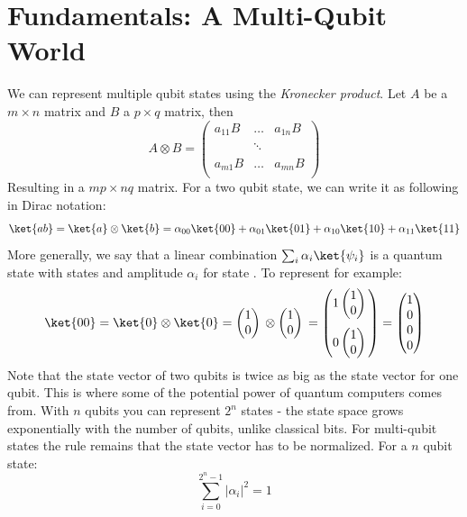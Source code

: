 \documentclass[11pt, notitlepage]{report}
\newcommand{\qstatezero}{
  \begin{pmatrix}1 \\ 0\end{pmatrix}
}
\begin{document}
\newpage

\chapter{Fundamentals: A Multi-Qubit World}
We can represent multiple qubit states using the \emph{Kronecker product}. Let $A$ be a $m \times n$ matrix and $B$ a $p \times q$ matrix, then
\[
A \otimes B =
  \begin{pmatrix}
  a_{11}B & \dots & a_{1n}B \\
  \phantom{a_{11}B} & \ddots & \phantom{a_{1n}B} \\
  a_{m1}B & \dots & a_{mn}B \\
  \end{pmatrix}
\]
Resulting in a $mp \times nq$ matrix. For a two qubit state, we can write it as following in Dirac notation:
\[
  \ket{ab} = \ket{a} \otimes \ket{b} = \alpha_{00}\ket{00} + \alpha_{01}\ket{01} + \alpha_{10}\ket{10} + \alpha_{11}\ket{11}
\]
More generally, we say that a linear combination $\sum_{i} \alpha_i\ket{\psi_i}$ is a quantum state with states  and amplitude $\alpha_i$ for state . To represent  for example:
\[
  \ket{00} = \ket{0} \otimes \ket{0} = \qstatezero{} \otimes \qstatezero{} =
  \begin{pmatrix}
  1\qstatezero{} \\[13pt]
  0\qstatezero{}
  \end{pmatrix}
  =
  \begin{pmatrix}
  1 \\
  0 \\
  0 \\
  0
  \end{pmatrix}
\]
Note that the state vector of two qubits is twice as big as the state vector for one qubit. This is where some of the potential power of quantum computers comes from. With $n$ qubits you can represent $2^n$ states - the state space grows exponentially with the number of qubits, unlike classical bits. For multi-qubit states the rule remains that the state vector has to be normalized. For a $n$ qubit state:
\[
\sum_{i = 0}^{2^n-1} |\alpha_i|^2 = 1
\]
\end{document}
